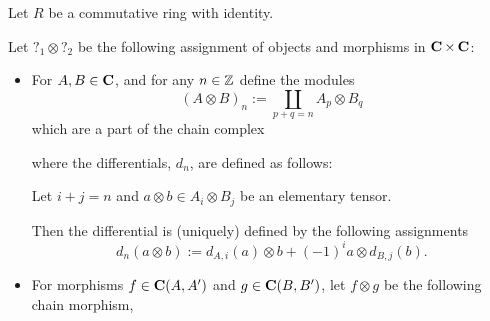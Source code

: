 \begin{definition}
    \label{def:tensor_product_of_chain_complexes_over_Mod(R)}
    Let \( R \) be a commutative ring with identity.
    
    Let \( ?_1 \otimes ?_2 \) be the following assignment of objects and morphisms in \( \operatorname{\mathbf{C}} \times \operatorname{\mathbf{C}} \):
    \begin{itemize}
        \item {
            For \( A, B \in \operatorname{\mathbf{C}} \), and for any  \( n \in {\mathbb{Z}} \) define the modules
            \[
                (A \otimes B)_n := \coprod_{p + q = n} A_p \otimes B_q
            \]
            which are a part of the chain complex
            \begin{center}
            \end{center}
            where the differentials, \( d_n \), are defined as follows:
            
            Let \( i + j = n \) and \( a \otimes b \in A_i \otimes B_j \) be an elementary tensor.

            Then the differential is (uniquely) defined by the following assignments
            \[
                d_n(a \otimes b) := d_{A, i}(a) \otimes b + (-1)^{i} a \otimes d_{B, j}(b).
            \]
        }
        \item {
            For morphisms \( f \in \operatorname{\mathbf{C}}(A, A') \) and \( g \in \operatorname{\mathbf{C}}(B, B') \), let \( f \otimes g \) be the following chain morphism,
            \begin{center}
\end{center}}
\end{itemize}
\end{definition}
